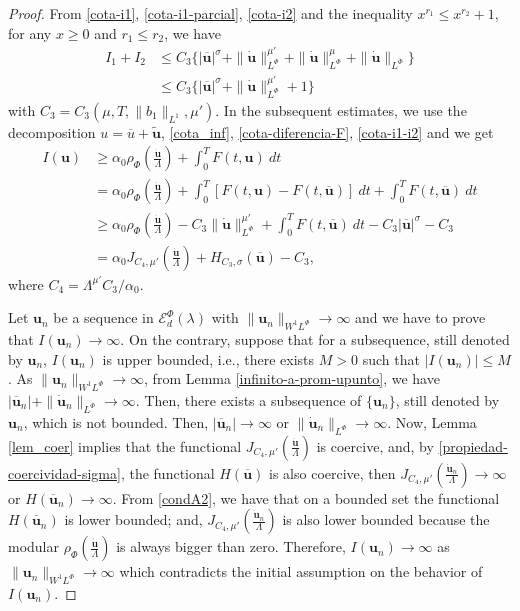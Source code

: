 \documentclass[twoside]{article}
\theoremstyle{remark}
\newcommand{\orlnor}{\|_{L^{\Phi}}}
\newcommand{\lphi}{L^{\Phi}}
\newcommand{\sobnor}{\|_{W^{1}\lphi}}
\newcommand{\domi}{\mathcal{E}^{\Phi}_d(\lambda)}
\renewcommand{\b}[1]{\boldsymbol{#1}}
\renewcommand{\leq}{\leqslant}
\begin{document}
\begin{proof}
From \eqref{cota-i1}, \eqref{cota-i1-parcial}, \eqref{cota-i2} and the inequality $x^{r_1}\leq x^{r_2}+1$, for any $x\geq 0$ and $r_1\leq r_2$, we have
\begin{equation}\label{cota-i1-i2}
\begin{split}
I_1+I_2
&\leq C_3\bigg\{ |\b{\overline{u}}|^{\sigma}
+ \|\b{\dot u}\orlnor^{\mu'}
+ \|\b{\dot u}\orlnor^{\mu}
+\|\b{\dot u}\orlnor\bigg\}\\
&\leq C_3\bigg\{ |\b{\overline{u}}|^{\sigma}
+ \|\b{\dot u}\orlnor^{\mu'}
+1\bigg\}
\end{split}
\end{equation}
with $C_3= C_3(\mu,T, \|b_1\|_{L^1},\mu' )$. In the subsequent estimates, we use the decomposition $u=\overline{u}+\b{\tilde{u}}$, \eqref{cota_inf}, \eqref{cota-diferencia-F},
\eqref{cota-i1-i2} and we get
\begin{equation}\label{cota_inf_I}
\begin{split}
I(\b{u})&\geq\alpha_0\rho_{\Phi}\left( \frac{\b{\dot{u}}}{\Lambda}\right)+\int_0^TF(t,\b{u})\ dt
\\ 
&=\alpha_0\rho_{\Phi}\left( \frac{\b{\dot{u}}}{\Lambda}\right)+ \int_0^T \left[F(t,\b{u})-F(t,\b{\overline{u}})\right]\ dt 
+  \int_0^TF(t,\b{\overline{u}})\ dt
\\
&\geq \alpha_0\rho_{\Phi}\left( \frac{\b{\dot{u}}}{\Lambda}\right)
-C_3 \|\b{\dot u}\orlnor^{\mu'}
+\int_0^TF(t,\b{\overline{u}})\ dt-
C_3 |\b{\overline{u}}|^{\sigma}-C_3\\
&=\alpha_0J_{C_4,\mu'}\left(\frac{\b{\dot u}}{\Lambda}\right)
+ H_{C_3,\sigma}(\b{\overline{u}})-C_3,
\end{split}
\end{equation}
where $C_4=\Lambda^{\mu'}C_3/\alpha_0$.


Let $\b{u}_n$ be  a sequence in $\domi$ with 
$\|\b{u}_n\sobnor\to\infty$ and we have to prove that $I(\b{u}_n)\to\infty$. 
On the contrary, suppose  that for a subsequence, 
still denoted by $\b{u}_n$, $I(\b{u}_n)$ is upper bounded, i.e., there exists $M>0$ such that $|I(\b{u}_{n})|\leq M$. 
As $\|\b{u}_n\sobnor\to\infty$, from Lemma \ref{infinito-a-prom-upunto},  we have $|\overline{\b{u}}_n|+\|\b{\dot{u}}_n\orlnor\to \infty$.
Then, there exists a subsequence of $\{\b{u}_n\}$, still denoted by $\b{u}_n$, which is not bounded.
Then, 
$|\b{\overline u}_n|\to \infty$ or $\|\b{\dot{u}}_n\orlnor\to \infty$.
Now, Lemma \ref{lem_coer} implies that the functional $J_{C_4,\mu'}(\frac{\b{\dot u}}{\Lambda})$ is coercive,
and, by \eqref{propiedad-coercividad-sigma},
the functional $H(\b{\overline{u}})$ is also coercive, then 
$J_{C_4,\mu'}(\frac{\b{\dot u}_n}{\Lambda}) \to \infty$ or $H(\b{\overline{u}}_n)\to \infty$.
From \eqref{condA2}, we have that on a bounded set the functional $H(\b{\overline{u}}_n)$ is lower bounded; and, $J_{C_4,\mu'}(\frac{\b{\dot u}_n}{\Lambda})$ is also lower bounded  because the modular $\rho_{\Phi}\left(\frac{\b{\dot u}}{\Lambda}\right)$ is always bigger than zero. 
Therefore,  $I(\b{u}_n)\to\infty$ as $\|\b{u}_n\sobnor\to\infty$ which contradicts the initial assumption on the behavior of $I(\b{u}_n)$. 
\end{proof}
\end{document}
